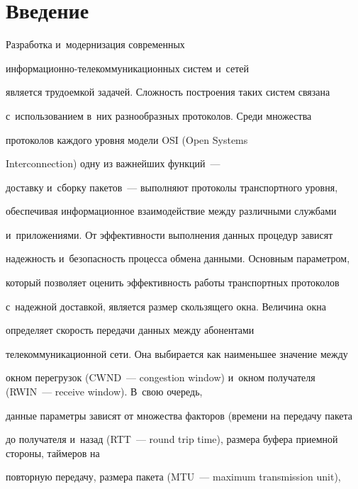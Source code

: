       \thispagestyle{headings}





\section{Введение}





\vspace*{-2pt}





  Разработка и~модернизация современных


  информационно-те\-ле\-ком\-му\-ни\-ка\-ци\-он\-ных сис\-тем и~сетей


является трудоемкой задачей. Сложность построения таких систем связана


с~использованием в~них разнообразных протоколов. Среди множества


протоколов каждого уровня модели OSI (Open Systems


Interconnection) одну из важнейших функций~---


доставку и~сборку пакетов~--- выполняют протоколы транспортного уровня,


обеспечивая информационное взаимодействие между различными службами


и~приложениями. От эффективности выполнения данных процедур зависят


надежность и~безопасность процесса обмена данными. Основным параметром,


который позволяет оценить эффективность работы транспортных протоколов


с~надежной доставкой, является размер скользящего окна. Величина окна


определяет скорость передачи данных между абонентами


телекоммуникационной сети. Она выбирается как наименьшее значение между


окном перегрузок (CWND~--- congestion window) и~окном получателя (RWIN~--- receive window). В~свою очередь,


данные параметры зависят от множества факторов (времени на передачу пакета


до получателя и~назад (RTT~--- round trip time), размера буфера приемной стороны, таймеров на


повторную передачу, размера пакета (MTU~--- maximum transmission unit),


